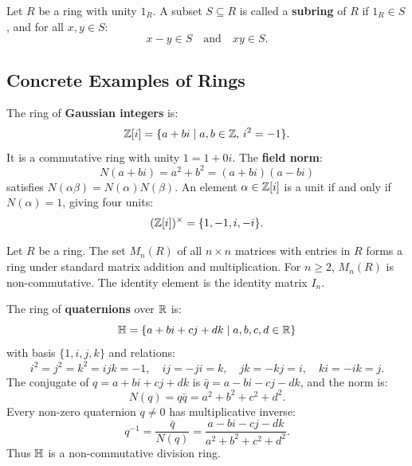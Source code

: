 \begin{definition}[Subring]
Let $R$ be a ring with unity $1_R$. A subset $S \subseteq R$ is called a \textbf{subring} of $R$ if $1_R \in S$, and for all $x, y \in S$:
\begin{equation}
x - y \in S \quad \text{and} \quad xy \in S.
\end{equation}
\end{definition}

\subsection{Concrete Examples of Rings}

\begin{example}
The ring of \textbf{Gaussian integers} is:
\begin{equation}
\mathbb{Z}[i] = \{ a + bi \mid a, b \in \mathbb{Z}, \, i^2 = -1 \}.
\end{equation}
It is a commutative ring with unity $1 = 1 + 0i$. The \textbf{field norm}:
\begin{equation}
N(a + bi) = a^2 + b^2 = (a + bi)(a - bi)
\end{equation}
satisfies $N(\alpha \beta) = N(\alpha)N(\beta)$.
An element $\alpha \in \mathbb{Z}[i]$ is a unit if and only if $N(\alpha) = 1$, giving four units:
\begin{equation}
(\mathbb{Z}[i])^\times = \{ 1, -1, i, -i \}.
\end{equation}
\end{example}

\begin{example}
Let $R$ be a ring. The set $M_n(R)$ of all $n \times n$ matrices with entries in $R$ forms a ring under standard matrix addition and multiplication.
For $n \ge 2$, $M_n(R)$ is non-commutative. The identity element is the identity matrix $I_n$.
\end{example}

\begin{example}
The ring of \textbf{quaternions} over $\mathbb{R}$ is:
\begin{equation}
\mathbb{H} = \{ a + bi + cj + dk \mid a, b, c, d \in \mathbb{R} \}
\end{equation}
with basis $\{1, i, j, k\}$ and relations:
\begin{equation}
i^2 = j^2 = k^2 = ijk = -1, \quad ij = -ji = k, \quad jk = -kj = i, \quad ki = -ik = j.
\end{equation}
The conjugate of $q = a + bi + cj + dk$ is $\bar{q} = a - bi - cj - dk$, and the norm is:
\begin{equation}
N(q) = q \bar{q} = a^2 + b^2 + c^2 + d^2.
\end{equation}
Every non-zero quaternion $q \ne 0$ has multiplicative inverse:
\begin{equation}
q^{-1} = \frac{\bar{q}}{N(q)} = \frac{a - bi - cj - dk}{a^2 + b^2 + c^2 + d^2}.
\end{equation}
Thus $\mathbb{H}$ is a non-commutative division ring.
\end{example}

